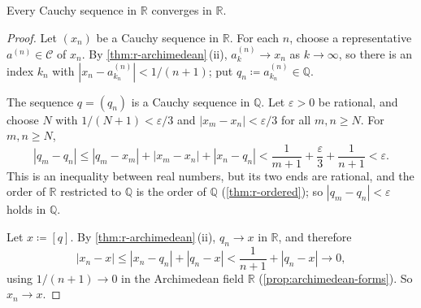 \begin{figure}
\end{figure}

\begin{theorem}
\label{thm:r-cauchy-complete}
Every Cauchy sequence in $\mathbb R$ converges in $\mathbb R$.
\end{theorem}

\begin{proof}
Let $(x_n)$ be a Cauchy sequence in $\mathbb R$. For each $n$, choose a representative $a^{(n)}\in\mathcal C$ of $x_n$. By \cref{thm:r-archimedean}\,(ii), $a^{(n)}_k\to x_n$ as $k\to\infty$, so there is an index $k_n$ with $|x_n-a^{(n)}_{k_n}|<1/(n+1)$; put $q_n\coloneqq a^{(n)}_{k_n}\in\mathbb Q$.

The sequence $q=(q_n)$ is a Cauchy sequence in $\mathbb Q$. Let $\varepsilon>0$ be rational, and choose $N$ with $1/(N+1)<\varepsilon/3$ and $|x_m-x_n|<\varepsilon/3$ for all $m,n\ge N$. For $m,n\ge N$,
\[
|q_m-q_n|\le|q_m-x_m|+|x_m-x_n|+|x_n-q_n|<\frac1{m+1}+\frac\varepsilon3+\frac1{n+1}<\varepsilon .
\]
This is an inequality between real numbers, but its two ends are rational, and the order of $\mathbb R$ restricted to $\mathbb Q$ is the order of $\mathbb Q$ (\cref{thm:r-ordered}); so $|q_m-q_n|<\varepsilon$ holds in $\mathbb Q$.

Let $x\coloneqq[q]$. By \cref{thm:r-archimedean}\,(ii), $q_n\to x$ in $\mathbb R$, and therefore
\[
|x_n-x|\le|x_n-q_n|+|q_n-x|<\frac1{n+1}+|q_n-x|\to0 ,
\]
using $1/(n+1)\to0$ in the Archimedean field $\mathbb R$ (\cref{prop:archimedean-forms}). So $x_n\to x$.
\end{proof}

